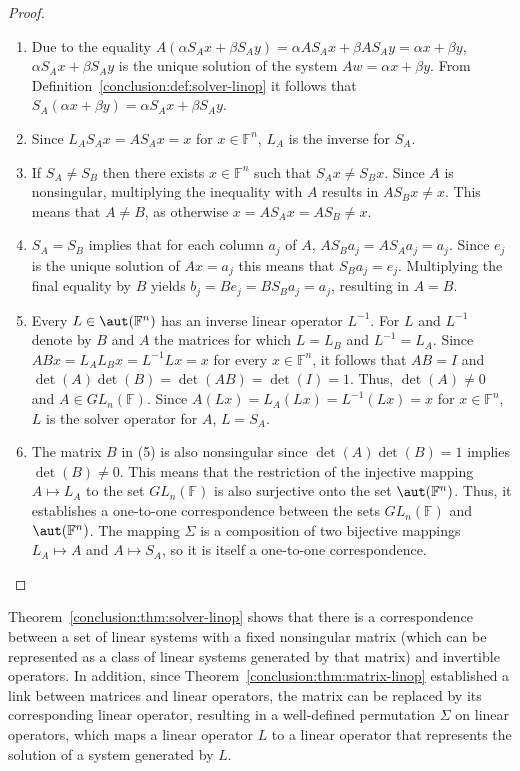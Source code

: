 \begin{proof}\leavevmode
\begin{enumerate}
\item Due to the equality $A(\alpha S_A x + \beta S_A y) = \alpha A S_A x +
\beta A S_A y = \alpha x + \beta y$, $\alpha S_A x + \beta S_A y$ is the
unique solution of the system $Aw = \alpha x + \beta y$. From
Definition~\ref{conclusion:def:solver-linop} it follows that $S_A(\alpha x +
\beta y) = \alpha S_A x + \beta S_A y$.
\item Since $L_A S_A x = A S_A x = x$ for $x \in \mathbb{F}^n$, $L_A$ is the
inverse for $S_A$.
\item If $S_A \neq S_B$ then there exists $x \in \mathbb{F}^n$ such that $S_A x
\neq S_B x$. Since $A$ is nonsingular, multiplying the inequality with $A$
results in $A S_B x \neq x$. This means that $A \neq B$, as otherwise $x = A S_A
x = A S_B \neq x$.
\item $S_A = S_B$ implies that for each column $a_j$ of $A$, $A S_B a_j = A S_A
a_j = a_j$. Since $e_j$ is the unique solution of $Ax = a_j$ this means that
$S_B a_j = e_j$. Multiplying the final equality by $B$ yields $b_j = B e_j = B
S_B a_j = a_j$, resulting in $A = B$.
\item Every $L \in \aut(\mathbb{F}^n)$ has an inverse linear operator $L^{-1}$.
For $L$ and $L^{-1}$ denote by $B$ and $A$ the matrices for which $L = L_B$ and
$L^{-1} = L_A$. Since $ABx = L_A L_B x = L^{-1}Lx = x$ for every
$x \in \mathbb{F}^n$, it follows that $AB = I$ and $\det(A)\det(B) = \det(AB) =
\det(I) = 1$. Thus, $\det(A) \neq 0$ and $A \in GL_n(\mathbb{F})$. Since $A(Lx)
= L_A(Lx) = L^{-1}(Lx) = x$ for $x \in \mathbb{F}^n$, $L$ is the solver operator
for $A$, \ie $L = S_A$.
\item The matrix $B$ in (5) is also nonsingular since $\det(A)\det(B) = 1$
implies $\det(B) \neq 0$. This means that the restriction of the injective
mapping $A \mapsto L_A$ to the set $GL_n(\mathbb{F})$ is also surjective onto
the set $\aut(\mathbb{F}^n)$. Thus, it establishes a one-to-one correspondence
between the sets $GL_n(\mathbb{F})$ and $\aut(\mathbb{F}^n)$.  The mapping
$\Sigma$ is a composition of two bijective mappings $L_A \mapsto A$ and $A
\mapsto S_A$, so it is itself a one-to-one correspondence.
\end{enumerate}
\end{proof}

Theorem~\ref{conclusion:thm:solver-linop} shows that there is a correspondence
between a set of linear systems with a fixed nonsingular matrix (which can be
represented as a class of linear systems generated by that matrix) and
invertible operators.  In addition, since
Theorem~\ref{conclusion:thm:matrix-linop} established a link between matrices
and linear operators, the matrix can be replaced by its corresponding linear
operator, resulting in a well-defined permutation $\Sigma$ on linear operators,
which maps a linear operator $L$ to a linear operator that represents the
solution of a system generated by $L$.

